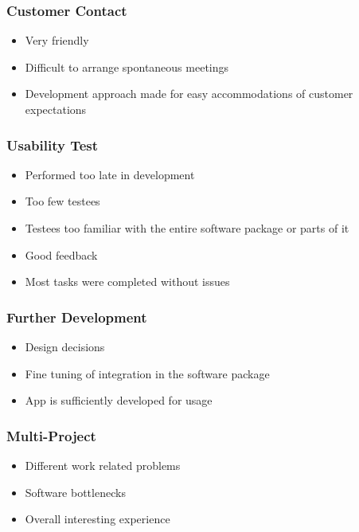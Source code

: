 		\begin{frame}
			\frametitle{Customer Contact}
			\begin{itemize}
				\item Very friendly
				\item Difficult to arrange spontaneous meetings
				\item Development approach made for easy accommodations of customer expectations
			\end{itemize}
		\end{frame}
		
		\begin{frame}
			\frametitle{Usability Test}
			\begin{itemize}
				\item Performed too late in development
				\item Too few testees
				\item Testees too familiar with the entire software package or parts of it
				\item Good feedback
				\item Most tasks were completed without issues
			\end{itemize}
		\end{frame}
		
		\begin{frame}
			\frametitle{Further Development}
			\begin{itemize}
				\item Design decisions
				\item Fine tuning of integration in the software package
				\item App is sufficiently developed for usage
			\end{itemize}
		\end{frame}
		
				
		\begin{frame}
			\frametitle{Multi-Project}
			\begin{itemize}
				\item Different work related problems
				\item Software bottlenecks
			     \item Overall interesting experience
			\end{itemize}
		\end{frame}